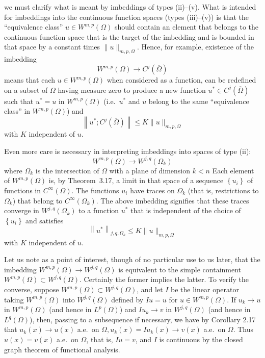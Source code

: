 \begin{para}
  we must clarify what is meant by imbeddings of types (ii)--(v).
  What is intended for imbeddings into the continuous function spaces (types (iii)--(v)) is that 
  the ``equivalence class'' $u \in W^{m, p}(\Omega)$ should contain an element that belongs to the 
  continuous function space that is the target of the imbedding and is bounded in that space by a 
  constant times $\|u\|_{m,p,\Omega}$. Hence, for example, existence of the imbedding
  \[
  W^{m, p}(\Omega) \rightarrow C^j(\overline{\Omega})
  \]
  means that each $u \in W^{m, p}(\Omega)$ when considered as a function,
  can be redefined on a subset of $\Omega$ having measure zero to produce
  a new function $u^* \in C^j(\overline{\Omega})$ such that $u^*=u$ in $W^{m,p}(\Omega)$
  (i.e.~$u^*$ and $u$ belong to the same ``equivalence class'' in $W^{m,p}(\Omega)$) and
  \[
  \left\|u^* ; C^j(\overline{\Omega})\right\| \leq K\|u\|_{m, p, \Omega}
  \]
  with $K$ independent of $u$.
  
  Even more care is necessary in interpreting imbeddings into spaces of type (ii):
  \[
  W^{m, p}(\Omega) \rightarrow W^{j, q}\left(\Omega_k\right)
  \]
  where $\Omega_k$ is the intersection of $\Omega$ with a plane of dimension $k<n$
  Each element of $W^{m,p}(\Omega)$ is, by Theorem~3.17, a limit in that space of a sequence 
  $\left\{u_i\right\}$ of functions in $C^{\infty}(\Omega)$.
  The functions $u_i$ have traces on $\Omega_k$ (that is, restrictions to $\Omega_k$) that belong 
  to $C^{\infty}\left(\Omega_k\right)$. The above imbedding signifies that these traces converge 
  in $W^{j, q}\left(\Omega_k\right)$ to a function $u^*$ that is independent of the choice of 
  $\left\{u_i\right\}$ and satisfies
  \[
  \left\|u^*\right\|_{j, q, \Omega_k} \leq K\|u\|_{m, p, \Omega}
  \]
  with $K$ independent of $u$.
\end{para}


\begin{para}
  Let us note as a point of interest, though of no particular use to us later,
  that the imbedding $W^{m,p}(\Omega) \rightarrow W^{j,q}(\Omega)$ is equivalent to the simple 
  containment $W^{m,p}(\Omega) \subset W^{j, q}(\Omega)$. Certainly the former implies the 
  latter. To verify the converse, suppose $W^{m,p}(\Omega) \subset W^{j,q}(\Omega)$, and let $I$ 
  be the linear operator taking $W^{m,p}(\Omega)$ into $W^{j, q}(\Omega)$ defined by $I u=u$ for 
  $u \in W^{m, p}(\Omega)$. If $u_k \rightarrow u$ in $W^{m,p}(\Omega)$
  (and hence in $L^p(\Omega)$) and $I u_k \rightarrow v$ in $W^{j,q}(\Omega)$
  (and hence in $L^q(\Omega)$), then, passing to a subsequence if necessary,
  we have by Corollary 2.17 that
  $u_k(x) \rightarrow u(x)$ a.e.~on $\Omega, u_k(x)=I u_k(x) \rightarrow v(x)$ a.e.~on $\Omega$. 
  Thus $u(x)=v(x)$ a.e.~on $\Omega$, that is, $I u=v$, and $I$ is continuous by the closed graph 
  theorem of functional analysis.
\end{para}


